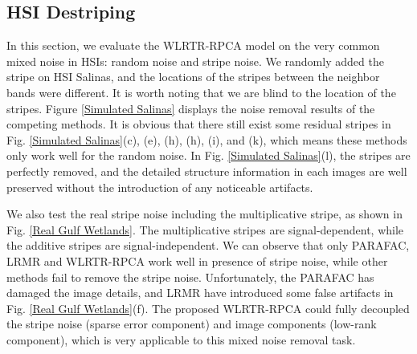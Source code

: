 \documentclass[twocolumn]{svjour3}          %
\begin{document}
  \subsection{HSI Destriping}
    In this section, we evaluate the WLRTR-RPCA model on the very common mixed noise in HSIs: random noise and stripe noise. We randomly added the stripe on HSI Salinas, and the locations of the stripes between the neighbor bands were different. It is worth noting that we are blind to the location of the stripes. Figure \ref{Simulated Salinas} displays the noise removal results of the competing methods. It is obvious that there still exist some residual stripes in Fig. \ref{Simulated Salinas}(c), (e), (h), (h), (i), and (k), which means these methods only work well for the random noise. In Fig. \ref{Simulated Salinas}(l), the stripes are perfectly removed, and the detailed structure information in each images are well preserved without the introduction of any noticeable artifacts.

    We also test the real stripe noise including the multiplicative stripe, as shown in Fig. \ref{Real Gulf Wetlands}. The multiplicative stripes are signal-dependent, while the additive stripes are signal-independent. We can observe that only PARAFAC, LRMR and WLRTR-RPCA work well in presence of stripe noise, while other methods fail to remove the stripe noise. Unfortunately, the PARAFAC has damaged the image details, and LRMR have introduced some false artifacts in Fig. \ref{Real Gulf Wetlands}(f). The proposed WLRTR-RPCA could fully decoupled the stripe noise (sparse error component) and image components (low-rank component), which is very applicable to this mixed noise removal task.
\end{document}
